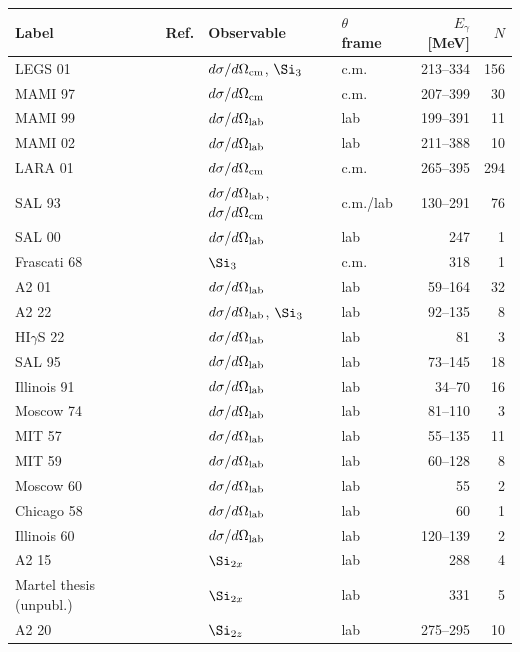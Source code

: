 \begin{tabular}{llllrr}
\hline
Label & Ref. & Observable & $\theta$ frame & $E_\gamma$ [MeV] & $N$\\
\hline
LEGS 01 & \cite{Blanpied:2001ae} & $d\sigma/d\Omega_{\rm cm}$, $\Si_3$ & c.m. & 213--334 & 156\\
MAMI 97 & \cite{Hunger:1997pt} & $d\sigma/d\Omega_{\rm cm}$ & c.m. & 207--399 & 30\\
MAMI 99 & \cite{Wissmann:1999vi} & $d\sigma/d\Omega_{\rm lab}$ & lab & 199--391 & 11\\
MAMI 02 & \cite{Camen:2001st,Kossert:2002ws} & $d\sigma/d\Omega_{\rm lab}$ & lab & 211--388 & 10\\
LARA 01 & \cite{Wolf:2001ha} & $d\sigma/d\Omega_{\rm cm}$ & c.m. & 265--395 & 294\\
SAL 93 & \cite{Hallin:1993ft} & $d\sigma/d\Omega_{\rm lab}$, $d\sigma/d\Omega_{\rm cm}$ & c.m./lab & 130--291 & 76\\
SAL 00 & \cite{Kolb:2000ix} & $d\sigma/d\Omega_{\rm lab}$ & lab & 247 & 1\\
Frascati 68 & \cite{Barbiellini:1968rlx} & $\Si_3$ & c.m. & 318 & 1\\
A2 01 & \cite{deLeon:2001dnx} & $d\sigma/d\Omega_{\rm lab}$ & lab & 59--164 & 32\\
A2 22 & \cite{A2:2021wmm} & $d\sigma/d\Omega_{\rm lab}$, $\Si_3$ & lab & 92--135 & 8\\
HI$\gamma$S 22 & \cite{Li:2022vnz} & $d\sigma/d\Omega_{\rm lab}$ & lab & 81 & 3\\
SAL 95 & \cite{MacGibbon:1995in} & $d\sigma/d\Omega_{\rm lab}$ & lab & 73--145 & 18\\
Illinois 91 & \cite{Federspiel:1991yd} & $d\sigma/d\Omega_{\rm lab}$ & lab & 34--70 & 16\\
Moscow 74 & \cite{Baranov:1974ec,Baranov:1975ju} & $d\sigma/d\Omega_{\rm lab}$ & lab & 81--110 & 3\\
MIT 57 & \cite{Pugh:1957zz} & $d\sigma/d\Omega_{\rm lab}$ & lab & 55--135 & 11\\
MIT 59 & \cite{Hyman:1959zz} & $d\sigma/d\Omega_{\rm lab}$ & lab & 60--128 & 8\\
Moscow 60 & \cite{Goldansky:1960zz} & $d\sigma/d\Omega_{\rm lab}$ & lab & 55 & 2\\
Chicago 58 & \cite{Oxley:1958zz} & $d\sigma/d\Omega_{\rm lab}$ & lab & 60 & 1\\
Illinois 60 & \cite{Bernardini:1960wya} & $d\sigma/d\Omega_{\rm lab}$ & lab & 120--139 & 2\\
A2 15 & \cite{A2:2014iky} & $\Si_{2x}$ & lab & 288 & 4\\
Martel thesis (unpubl.) & \cite{Martel:2013phd} & $\Si_{2x}$ & lab & 331 & 5\\
A2 20 & \cite{A2:2019bqm} & $\Si_{2z}$ & lab & 275--295 & 10\\
\hline
\end{tabular}
